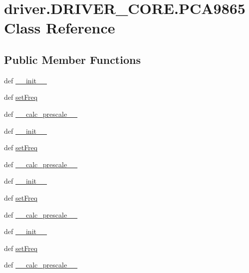 \hypertarget{classdriver_1_1DRIVER__CORE_1_1PCA9865}{}\section{driver.\+D\+R\+I\+V\+E\+R\+\_\+\+C\+O\+R\+E.\+P\+C\+A9865 Class Reference}
\label{classdriver_1_1DRIVER__CORE_1_1PCA9865}
\subsection*{Public Member Functions}
\begin{DoxyCompactItemize}
\item 
def \hyperlink{classdriver_1_1DRIVER__CORE_1_1PCA9865_ae727575a3372b8b4d90ffa314081c489}{\+\_\+\+\_\+init\+\_\+\+\_\+}
\item 
def \hyperlink{classdriver_1_1DRIVER__CORE_1_1PCA9865_a425edd2aa5693f5fea64d0aec65f77e8}{set\+Freq}
\item 
def \hyperlink{classdriver_1_1DRIVER__CORE_1_1PCA9865_a2482e9c19788095bfc47ebdb62b4903d}{\+\_\+\+\_\+calc\+\_\+prescale\+\_\+\+\_\+}
\item 
def \hyperlink{classdriver_1_1DRIVER__CORE_1_1PCA9865_ae727575a3372b8b4d90ffa314081c489}{\+\_\+\+\_\+init\+\_\+\+\_\+}
\item 
def \hyperlink{classdriver_1_1DRIVER__CORE_1_1PCA9865_a425edd2aa5693f5fea64d0aec65f77e8}{set\+Freq}
\item 
def \hyperlink{classdriver_1_1DRIVER__CORE_1_1PCA9865_a2482e9c19788095bfc47ebdb62b4903d}{\+\_\+\+\_\+calc\+\_\+prescale\+\_\+\+\_\+}
\item 
def \hyperlink{classdriver_1_1DRIVER__CORE_1_1PCA9865_ae727575a3372b8b4d90ffa314081c489}{\+\_\+\+\_\+init\+\_\+\+\_\+}
\item 
def \hyperlink{classdriver_1_1DRIVER__CORE_1_1PCA9865_a425edd2aa5693f5fea64d0aec65f77e8}{set\+Freq}
\item 
def \hyperlink{classdriver_1_1DRIVER__CORE_1_1PCA9865_a2482e9c19788095bfc47ebdb62b4903d}{\+\_\+\+\_\+calc\+\_\+prescale\+\_\+\+\_\+}
\item 
def \hyperlink{classdriver_1_1DRIVER__CORE_1_1PCA9865_ae727575a3372b8b4d90ffa314081c489}{\+\_\+\+\_\+init\+\_\+\+\_\+}
\item 
def \hyperlink{classdriver_1_1DRIVER__CORE_1_1PCA9865_a425edd2aa5693f5fea64d0aec65f77e8}{set\+Freq}
\item 
def \hyperlink{classdriver_1_1DRIVER__CORE_1_1PCA9865_a2482e9c19788095bfc47ebdb62b4903d}{\+\_\+\+\_\+calc\+\_\+prescale\+\_\+\+\_\+}
\end{DoxyCompactItemize}
